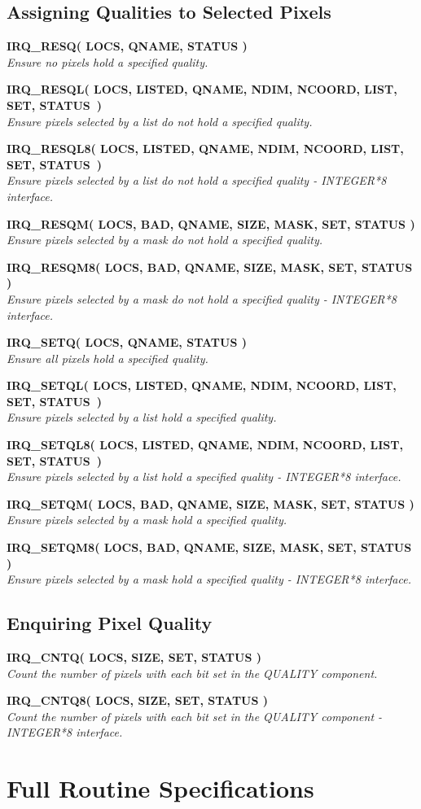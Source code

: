 \documentclass[twoside,11pt,nolof]{starlink}
\providecommand{\noteroutine}[2]{\textbf{#1}\hspace*{\fill}\nopagebreak \\
                             \hspace*{3em}\emph{#2}\hspace*{\fill}\par}
\begin{document}
\subsection{Assigning Qualities to Selected Pixels}
\noteroutine{IRQ\_RESQ( LOCS, QNAME, STATUS )}
   {Ensure no pixels hold a specified quality.}
\noteroutine{IRQ\_RESQL( LOCS, LISTED, QNAME, NDIM, NCOORD, LIST, SET,
STATUS~)}
   {Ensure pixels selected by a list do not hold a specified quality.}
\noteroutine{IRQ\_RESQL8( LOCS, LISTED, QNAME, NDIM, NCOORD, LIST, SET,
STATUS~)}
   {Ensure pixels selected by a list do not hold a specified quality - INTEGER*8 interface.}
\noteroutine{IRQ\_RESQM( LOCS, BAD, QNAME, SIZE, MASK, SET, STATUS )}
   {Ensure pixels selected by a mask do not hold a specified quality.}
\noteroutine{IRQ\_RESQM8( LOCS, BAD, QNAME, SIZE, MASK, SET, STATUS )}
   {Ensure pixels selected by a mask do not hold a specified quality - INTEGER*8 interface.}
\noteroutine{IRQ\_SETQ( LOCS, QNAME, STATUS )}
   {Ensure all pixels hold a specified quality.}
\noteroutine{IRQ\_SETQL( LOCS, LISTED, QNAME, NDIM, NCOORD, LIST, SET,
STATUS~)}
   {Ensure pixels selected by a list hold a specified quality.}
\noteroutine{IRQ\_SETQL8( LOCS, LISTED, QNAME, NDIM, NCOORD, LIST, SET,
STATUS~)}
   {Ensure pixels selected by a list hold a specified quality - INTEGER*8 interface.}
\noteroutine{IRQ\_SETQM( LOCS, BAD, QNAME, SIZE, MASK, SET, STATUS )}
   {Ensure pixels selected by a mask hold a specified quality.}
\noteroutine{IRQ\_SETQM8( LOCS, BAD, QNAME, SIZE, MASK, SET, STATUS )}
   {Ensure pixels selected by a mask hold a specified quality - INTEGER*8 interface.}

\subsection{Enquiring Pixel Quality}
\noteroutine{IRQ\_CNTQ( LOCS, SIZE, SET, STATUS )}
   {Count the number of pixels with each bit set in the QUALITY component.}
\noteroutine{IRQ\_CNTQ8( LOCS, SIZE, SET, STATUS )}
   {Count the number of pixels with each bit set in the QUALITY component - INTEGER*8 interface.}

\newpage
\section {Full Routine Specifications}
\label {SEC:FULLSPEC}
\end{document}
